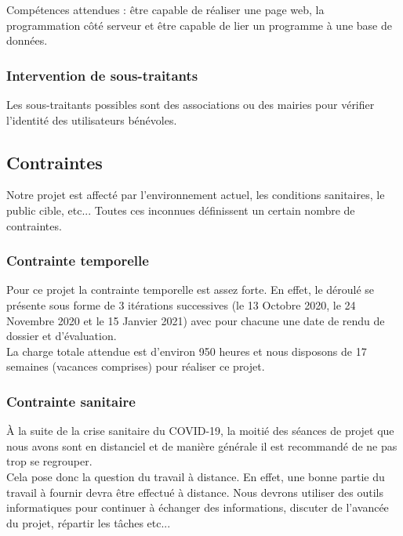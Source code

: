 \documentclass[a4paper,11pt]{article}
\begin{document}
Compétences attendues : être capable de réaliser une page web, la programmation côté serveur et
être capable de lier un programme à une base de données.\\

\subsubsection{Intervention de sous-traitants}

Les sous-traitants possibles sont des associations ou des mairies pour vérifier l’identité des utilisateurs
bénévoles.\\

\subsection{Contraintes}

Notre projet est affecté par l’environnement actuel, les conditions sanitaires, le public cible, etc...
Toutes ces inconnues définissent un certain nombre de contraintes.\\

\subsubsection{Contrainte temporelle}

Pour ce projet la contrainte temporelle est assez forte. En effet, le déroulé se présente sous forme de
3 itérations successives (le 13 Octobre 2020, le 24 Novembre 2020 et le 15 Janvier 2021) avec pour
chacune une date de rendu de dossier et d’évaluation.\\

La charge totale attendue est d’environ 950 heures et nous disposons de 17 semaines (vacances
comprises) pour réaliser ce projet.\\

\subsubsection{Contrainte sanitaire}

À la suite de la crise sanitaire du COVID-19, la moitié des séances de projet que nous avons sont en
distanciel et de manière générale il est recommandé de ne pas trop se regrouper.\\

Cela pose donc la question du travail à distance. En effet, une bonne partie du travail à fournir devra
être effectué à distance. Nous devrons utiliser des outils informatiques pour continuer à échanger des
informations, discuter de l’avancée du projet, répartir les tâches etc...\\
\end{document}
